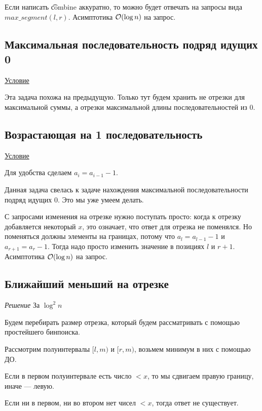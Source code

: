 Если написать \t{combine} аккуратно, то можно будет отвечать на запросы вида $max\_segment(l, r)$. Асимптотика $\mathcal{O}(\log n)$ на запрос.

\subsection{Максимальная последовательность подряд идущих 0} \href{https://informatics.mccme.ru/mod/statements/view3.php?chapterid=111798}{Условие}

Эта задача похожа на предыдущую. Только тут будем хранить не отрезки для максимальной суммы, а отрезки максимальной длины последовательностей из 0.

\subsection{Возрастающая на 1 последовательность} \href{https://informatics.mccme.ru/mod/statements/view.php?chapterid=113632}{Условие}

Для удобства сделаем $a_i = a_{i - 1} - 1$.

Данная задача свелась к задаче нахождения максимальной последовательности подряд идущих $0$. Это мы уже умеем делать.

С запросами изменения на отрезке нужно поступать просто: когда к отрезку добавляется некоторый $x$, это означает, что ответ для отрезка не поменялся. Но поменяться должны элементы на границах, потому что $a_l = a_{l - 1} - 1$ и $a_{r + 1} = a_r - 1$. Тогда надо просто изменить значение в позициях $l$ и $r + 1$. Асимптотика $\mathcal{O}(\log n)$ на запрос.

\pagebreak

\subsection{Ближайший меньший на отрезке}

{\it Решение } За $\log^2 n$	

Будем перебирать размер отрезка, который будем рассматривать с помощью простейшего бинпоиска.

Рассмотрим полуинтервалы $[l, m)$ и $[r, m)$, возьмем минимум в них с помощью ДО.

Если в первом полуинтервале есть число $< x$, то мы сдвигаем правую границу, иначе --- левую.

Если ни в первом, ни во втором нет чисел $< x$, тогда ответ не существует.

\down

